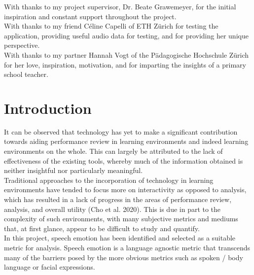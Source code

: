 \documentclass[12pt]{article}
\begin{document}
With thanks to my project supervisor, Dr. Beate Grawemeyer, for the initial inspiration and constant support throughout the project.
\\

\noindent With thanks to my friend Céline Capelli of ETH Zürich for testing the application, providing useful audio data for testing, and for providing her unique perspective.
\\

\noindent With thanks to my partner Hannah Vogt of the Pädagogische Hochschule Zürich for her love, inspiration, motivation, and for imparting the insights of a primary school teacher. 
\\
\newpage

\section{Introduction}

It can be observed that technology has yet to make a significant contribution towards aiding performance review in learning environments and indeed learning environments on the whole. This can largely be attributed to the lack of effectiveness of the existing tools, whereby much of the information obtained is neither insightful nor particularly meaningful.
\\

\noindent Traditional approaches to the incorporation of technology in learning environments have tended to focus more on interactivity as opposed to analysis, which has resulted in a lack of progress in the areas of performance review, analysis, and overall utility (Cho et al. 2020). This is due in part to the complexity of such environments, with many subjective metrics and mediums that, at first glance, appear to be difficult to study and quantify.
\\

\noindent In this project, speech emotion has been identified and selected as a suitable metric for analysis. Speech emotion is a language agnostic metric that transcends many of the barriers posed by the more obvious metrics such as spoken / body language or facial expressions.
\\
\end{document}

